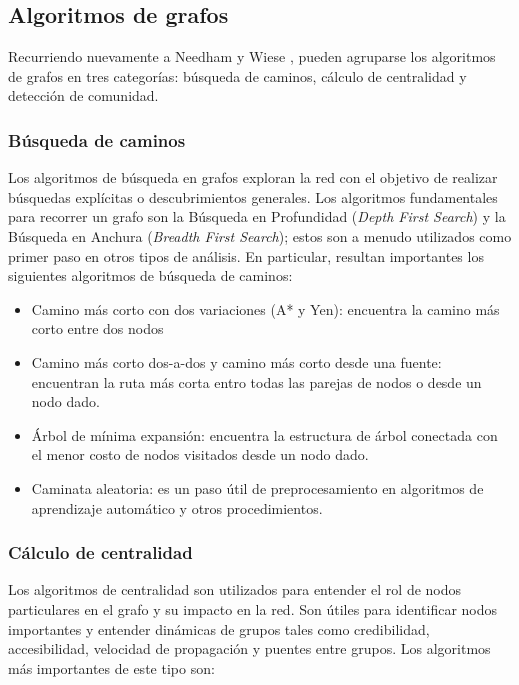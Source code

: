 \documentclass[11pt,letterpaper,oneside]{article}
\begin{document}
	\subsection{Algoritmos de grafos}
	
	Recurriendo nuevamente a Needham \cite{Needham-2019} y Wiese \cite{Wiese-2019}, pueden agruparse los algoritmos de grafos en tres categorías: búsqueda de caminos, cálculo de centralidad y detección de comunidad.
	
	\subsubsection{Búsqueda de caminos}
	Los algoritmos de búsqueda en grafos exploran la red con el objetivo de realizar búsquedas explícitas o descubrimientos generales. Los algoritmos fundamentales para recorrer un grafo son la Búsqueda en Profundidad ({\em Depth First Search}) y la Búsqueda en Anchura ({\em Breadth First Search}); estos son a menudo utilizados como primer paso en otros tipos de análisis. En particular, resultan importantes los siguientes algoritmos de búsqueda de caminos:
	
	\begin{itemize}
		\item Camino más corto con dos variaciones (A* y Yen): encuentra la camino más corto entre dos nodos
		\item Camino más corto dos-a-dos y camino más corto desde una fuente: encuentran la ruta más corta entro todas las parejas de nodos o desde un nodo dado.
		\item Árbol de mínima expansión: encuentra la estructura de árbol conectada con el menor costo de nodos visitados desde un nodo dado.
		\item Caminata aleatoria: es un paso útil de preprocesamiento en algoritmos de aprendizaje automático y otros procedimientos.
	\end{itemize}

	\subsubsection{Cálculo de centralidad}
	Los algoritmos de centralidad son utilizados para entender el rol de nodos particulares en el grafo y su impacto en la red. Son útiles para identificar nodos importantes y entender dinámicas de grupos tales como credibilidad, accesibilidad, velocidad de propagación y puentes entre grupos. Los algoritmos más importantes de este tipo son:
	
\end{document}
